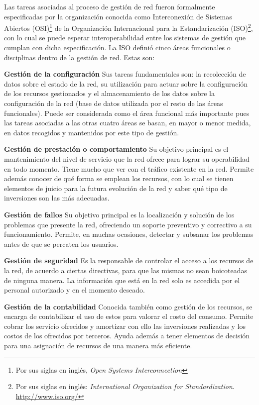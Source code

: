 Las tareas asociadas al proceso de gestión de red fueron formalmente
especificadas por la organización conocida como Interconexión de Sistemas
Abiertos (OSI)\footnote{Por sus siglas en inglés, \textit{Open Systems
Interconnection}} de la Organización Internacional para la Estandarización 
(ISO)\footnote{Por sus siglas en inglés: \textit{International Organization for
Standardization}. \\ \url{http://www.iso.org/}}, con lo cual se puede esperar
interoperabilidad entre los sistemas de gestión que cumplan con dicha
especificación. La ISO definió cinco áreas funcionales o disciplinas dentro de
la gestión de red. Estas son:

\textbf{Gestión de la configuración} Sus tareas fundamentales son: la
recolección de datos sobre el estado de la red, su utilización para actuar sobre
la configuración de los recursos gestionados y el almacenamiento de los datos
sobre la configuración de la red (base de datos utilizada por el resto de las
áreas funcionales). Puede ser considerada como el área funcional más importante
pues las tareas asociadas a las otras cuatro áreas se basan, en mayor o menor
medida, en datos recogidos y mantenidos por este tipo de gestión. %

\textbf{Gestión de prestación o comportamiento} Su objetivo principal es el
mantenimiento del nivel de servicio que la red ofrece para lograr su
operabilidad en todo momento. Tiene mucho que ver con el tráfico existente en la
red. Permite además conocer de qué forma se emplean los recursos, con lo cual se
tienen elementos de juicio para la futura evolución de la red y saber qué tipo
de inversiones son las más adecuadas. %

\textbf{Gestión de fallos} Su objetivo principal es la localización y solución
de los problemas que presente la red, ofreciendo un soporte preventivo y
correctivo a su funcionamiento. Permite, en muchas ocasiones, detectar y
subsanar los problemas antes de que se percaten los usuarios. %

\textbf{Gestión de seguridad} Es la responsable de controlar el acceso a los
recursos de la red, de acuerdo a ciertas directivas, para que las mismas no sean
boicoteadas de ninguna manera. La información que está en la red solo es
accedida por el personal autorizado y en el momento deseado. %

\textbf{Gestión de la contabilidad} Conocida también como gestión de los
recursos, se encarga de contabilizar el uso de estos para valorar el costo del
consumo. Permite cobrar los servicio ofrecidos y amortizar con ello las
inversiones realizadas y los costos de los ofrecidos por terceros. Ayuda además
a tener elementos de decisión para una asignación de recursos de una manera más
eficiente. %


